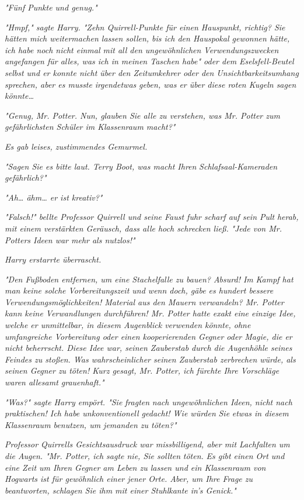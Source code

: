 {\emph{"Fünf Punkte und genug."}

\emph{"Hmpf," sagte Harry. "Zehn Quirrell-Punkte für einen Hauspunkt, richtig? Sie hätten mich weitermachen lassen sollen, bis ich den Hauspokal gewonnen hätte, ich habe noch nicht einmal mit all den ungewöhnlichen Verwendungszwecken angefangen für alles, was ich in meinen Taschen habe" oder dem Eselsfell-Beutel selbst und er konnte nicht über den Zeitumkehrer oder den Unsichtbarkeitsumhang sprechen, aber es musste} \emph{\emph{irgendetwas}} \emph{geben, was er über diese roten Kugeln sagen könnte…}

\emph{"\emph{Genug,}} \emph{Mr. Potter. Nun, glauben Sie alle zu verstehen, was Mr. Potter zum gefährlichsten Schüler im Klassenraum macht?"}

\emph{Es gab leises, zustimmendes Gemurmel.}

\emph{"Sagen Sie es bitte laut. Terry Boot, was macht Ihren} \emph{Schlafsaal-Kameraden} \emph{gefährlich?"}

\emph{"Ah… ähm… er ist kreativ?"}

\emph{"\emph{Falsch!}" bellte Professor Quirrell und seine Faust fuhr scharf auf sein Pult} \emph{herab, mit einem verstärkten Geräusch, dass alle hoch schrecken ließ.} \emph{"Jede von Mr. Potters Ideen war mehr als nutzlos!"}

\emph{Harry erstarrte überrascht.}

\emph{"Den Fußboden entfernen, um eine Stachelfalle zu bauen? Absurd! Im} \emph{Kampf hat man keine solche Vorbereitungszeit und wenn doch, gäbe es hundert bessere Verwendungsmöglichkeiten! Material aus den Mauern verwandeln? Mr. Potter kann keine Verwandlungen durchführen! Mr. Potter hatte exakt eine einzige Idee, welche er unmittelbar, in diesem Augenblick verwenden könnte, ohne umfangreiche Vorbereitung oder einen kooperierenden Gegner oder Magie, die er nicht beherrscht. Diese Idee war, seinen Zauberstab durch die Augenhöhle seines Feindes zu stoßen. Was wahrscheinlicher seinen Zauberstab zerbrechen würde, als seinen Gegner zu töten! Kurz gesagt, Mr. Potter, ich fürchte Ihre Vorschläge waren allesamt grauenhaft."}

\emph{"Was?" sagte Harry empört. "Sie} \emph{\emph{fragten}} \emph{nach ungewöhnlichen Ideen, nicht nach praktischen! Ich habe unkonventionell gedacht! Wie würden} \emph{\emph{Sie}} \emph{etwas in diesem Klassenraum benutzen, um jemanden zu töten?"}

\emph{Professor Quirrells Gesichtsausdruck war missbilligend, aber mit Lachfalten um die Augen. "Mr. Potter, ich sagte nie, Sie sollten} \emph{\emph{töten.}} \emph{Es gibt einen Ort und eine Zeit um Ihren Gegner am Leben zu lassen und ein Klassenraum von Hogwarts ist für gewöhnlich einer jener Orte. Aber, um Ihre Frage zu beantworten, schlagen Sie ihm mit einer Stuhlkante in's Genick."}

}
